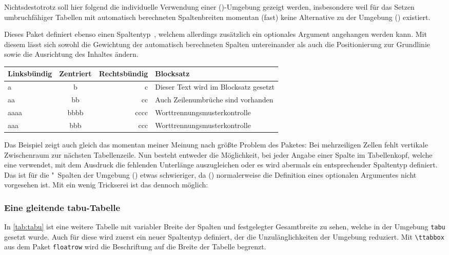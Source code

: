 \documentclass[%
  english,ngerman,%
  cdgeometry=no,DIV=12,automark,%
]{tudscrartcl}
\makeatletter
\newcommand*\pcolumnfuzz[1]{\pretocmd{\@endpbox}{\hfuzz=#1}{}{}}
\makeatother
\begin{document}
Nichtsdestotrotz soll hier folgend die individuelle Verwendung einer 
()-Umgebung gezeigt werden, insbesondere weil 
für das Setzen umbruchfähiger Tabellen mit automatisch berechneten 
Spaltenbreiten momentan (fast) keine Alternative zu der Umgebung 
() existiert. 

Dieses Paket definiert ebenso einen Spaltentyp~, welchem allerdings 
zusätzlich ein optionales Argument angehangen werden kann. Mit diesem lässt 
sich sowohl die Gewichtung der automatisch berechneten Spalten untereinander 
als auch die Positionierung zur Grundlinie sowie die Ausrichtung des Inhaltes 
ändern.
%
\begingroup
\pcolumnfuzz{70pt}
\begin{Hint*}
\begin{tabu} to 11.7cm {lcrX}
\toprule
\textbf{Linksbündig} & \textbf{Zentriert} & 
\textbf{Rechtsbündig} & \textbf{Blocksatz} \tabularnewline
\midrule
a    & b    & c    & Dieser Text wird im Blocksatz gesetzt\tabularnewline
aa   & bb   & cc   & Auch Zeilenumbrüche sind vorhanden\tabularnewline
aaaa & bbbb & cccc & Worttrennungsmus\-terkontrolle\tabularnewline
aaa  & bbb  & ccc  & Worttrennungsmusterkontrolle\tabularnewline
\bottomrule
\end{tabu}
\end{Hint*}
\endgroup
%
Das Beispiel zeigt auch gleich das momentan meiner Meinung nach größte Problem 
des Paketes: Bei mehrzeiligen Zellen fehlt vertikale Zwischenraum zur nächsten 
Tabellenzeile. Nun besteht entweder die Möglichkeit, bei jeder Angabe einer 
Spalte im Tabellenkopf, welche eine  verwendet, mit dem Ausdruck 
 die fehlenden Unterlänge auszugleichen 
oder es wird abermals ein entsprechender Spaltentyp definiert. Das ist für 
die "~Spalten der Umgebung () etwas 
schwieriger, da () normalerweise die 
Definition eines optionalen Argumentes nicht vorgesehen ist. Mit ein wenig 
Trickserei ist das dennoch möglich:
%
\begin{Trunk+}
\subsubsection{Eine gleitende tabu-Tabelle}
In \autoref{tab:tabu} ist eine weitere Tabelle mit variabler Breite der 
Spalten und festgelegter Gesamtbreite zu sehen, welche in der Umgebung 
\texttt{tabu} gesetzt wurde. Auch für diese wird zuerst ein neuer 
Spaltentyp definiert, der die Unzulänglichkeiten der Umgebung reduziert. 
Mit \texttt{\textbackslash ttabbox} aus dem Paket \texttt{floatrow} wird 
die Beschriftung auf die Breite der Tabelle begrenzt.

\end{Trunk+}
\end{document}
